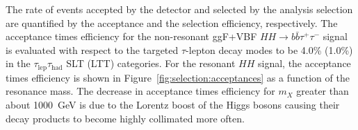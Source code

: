 The rate of events accepted by the detector 
and selected by the analysis selection are quantified by the acceptance and the selection efficiency,
respectively.
The acceptance times efficiency for the non-resonant ggF+VBF $HH\to b\bar b\tau^+\tau^-$ signal 
is evaluated with respect to the targeted $\tau$-lepton decay modes to be 4.0\% (1.0\%) 
in the $\tau_\text{lep}\tau_\text{had}$ SLT (LTT) categories.
For the resonant $HH$ signal, the acceptance times efficiency is shown in Figure~\ref{fig:selection:acceptances} 
as a function of the resonance mass. 
The decrease in acceptance times efficiency for $m_X$ greater than about 1000~GeV 
is due to the Lorentz boost of the Higgs bosons causing their decay products to become highly collimated more often.

